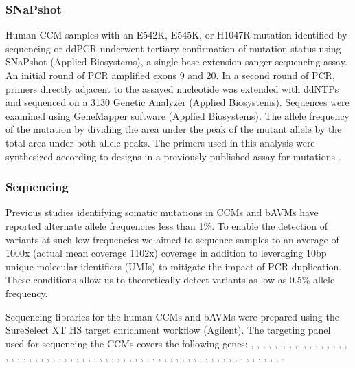 \subsubsection{SNaPshot}
Human CCM samples with an E542K, E545K, or H1047R  mutation identified by sequencing or ddPCR underwent tertiary confirmation of mutation status using SNaPshot (Applied Biosystems), a single-base extension sanger sequencing assay. An initial round of PCR amplified exons 9 and 20. In a second round of PCR, primers directly adjacent to the assayed nucleotide was extended with ddNTPs and sequenced on a 3130 Genetic Analyzer (Applied Biosystems). Sequences were examined using GeneMapper software (Applied Biosystems). The allele frequency of the mutation by dividing the area under the peak of the mutant allele by the total area under both allele peaks. The primers used in this analysis were synthesized according to designs in a previously published assay for  mutations \citep{hurst2009}.

\subsubsection{Sequencing}
Previous studies identifying somatic mutations in CCMs and bAVMs have reported alternate allele frequencies less than 1\%. To enable the detection of variants at such low frequencies we aimed to sequence samples to an average of 1000x (actual mean coverage 1102x) coverage in addition to leveraging 10bp unique molecular identifiers (UMIs) to mitigate the impact of PCR duplication. These conditions allow us to theoretically detect variants as low as 0.5\% allele frequency. 

Sequencing libraries for the human CCMs and bAVMs were prepared using the SureSelect XT HS target enrichment workflow (Agilent). The targeting panel used for sequencing the CCMs covers the following genes: , , , , ,  ,, , ,, , , , , , , , , , , , , , , , , , , , , , , , , , , , , , , , , , , , , , , , , , , , , , , , , , , , , , , , . 

